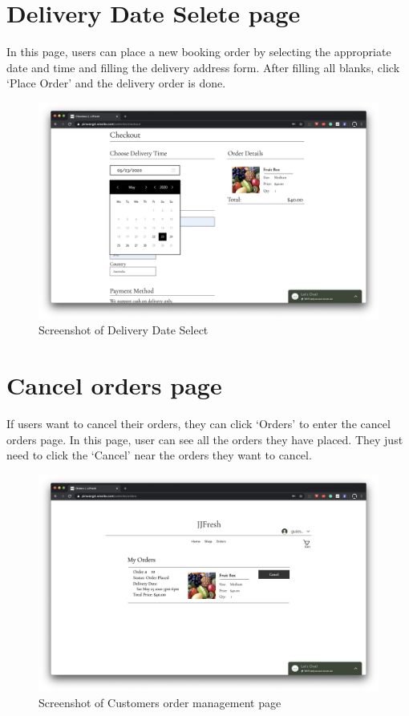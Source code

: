 \clearpage
\section*{Delivery Date Selete page}
In this page, users can place a new booking order by selecting the appropriate date and time and filling the delivery address form. After filling all blanks, click ‘Place Order’ and the delivery order is done.
\begin{figure}[htp]
\centering
\includegraphics[width=\textwidth]{Figures/dateSelect.png}
\caption{Screenshot of Delivery Date Select}
\label{fig:dateSelect}
\end{figure}

\clearpage
\section*{Cancel orders page}
If users want to cancel their orders, they can click ‘Orders’ to enter the cancel orders page. In this page, user can see all the orders they have placed. They just need to click the ‘Cancel’ near the orders they want to cancel.
\begin{figure}[htp]
\centering
\includegraphics[width=\textwidth]{Figures/customerOrder.png}
\caption{Screenshot of Customers order management page}
\label{fig:customerOrder}
\end{figure}

